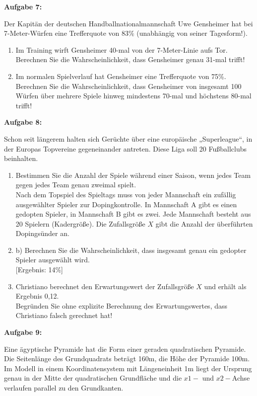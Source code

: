 \documentclass[a4paper,12pt]{article}
\newcommand{\Aufgabe}[1]{
  {
  \vspace*{0.5cm}
  \textsf{\textbf{Aufgabe #1}}
  \vspace*{0.2cm}
  
  }
}
\begin{document}
\Aufgabe{7:}
Der Kapitän der deutschen Handballnationalmannschaft Uwe Gensheimer hat bei 7-Meter-Würfen eine Trefferquote von 83\% (unabhängig von seiner Tagesform!).
\begin{enumerate}[label={\alph*)}]
  \item Im Training wirft Gensheimer 40-mal von der 7-Meter-Linie aufs Tor.\\
    Berechnen Sie die Wahrscheinlichkeit, dass Gensheimer genau 31-mal trifft!
  \item Im normalen Spielverlauf hat Gensheimer eine Trefferquote von 75\%.\\
    Berechnen Sie die Wahrscheinlichkeit, dass Gensheimer von insgesamt 100 Würfen über mehrere Spiele hinweg mindestens 70-mal und höchstens 80-mal trifft!
\end{enumerate}


\Aufgabe{8:}
Schon seit längerem halten sich Gerüchte über eine europäische „Superleague“, in der Europas Topvereine gegeneinander antreten. Diese Liga soll 20 Fußballclubs beinhalten.
\begin{enumerate}[label={\alph*)}]
  \item Bestimmen Sie die Anzahl der Spiele während einer Saison, wenn jedes Team gegen jedes Team genau zweimal spielt.\\

Nach dem Topspiel des Spieltags muss von jeder Mannschaft ein zufällig ausgewählter Spieler zur Dopingkontrolle. In Mannschaft A gibt es einen gedopten Spieler, in Mannschaft B gibt es zwei. Jede Mannschaft besteht aus 20 Spielern (Kadergröße). Die Zufallsgröße $X$  gibt die Anzahl der überführten Dopingsünder an.
  \item b) Berechnen Sie die Wahrscheinlichkeit, dass insgesamt genau ein gedopter Spieler ausgewählt wird.\\
    {[Ergebnis: 14\%]}
    \item Christiano berechnet den Erwartungswert der Zufallsgröße $X$ und erhält als Ergebnis 0,12.\\
Begründen Sie ohne explizite Berechnung des Erwartungswertes, dass Christiano falsch gerechnet hat!
\end{enumerate}


\Aufgabe{9:}
Eine ägyptische Pyramide hat die Form einer geraden quadratischen Pyramide. Die Seitenlänge des Grundquadrats beträgt 160m, die Höhe der Pyramide 100m. Im Modell in einem Koordinatensystem mit Längeneinheit 1m liegt der Ursprung genau in der Mitte der quadratischen Grundfläche und die $x1-$ und $x2-$Achse verlaufen parallel zu den Grundkanten. 
\end{document}
